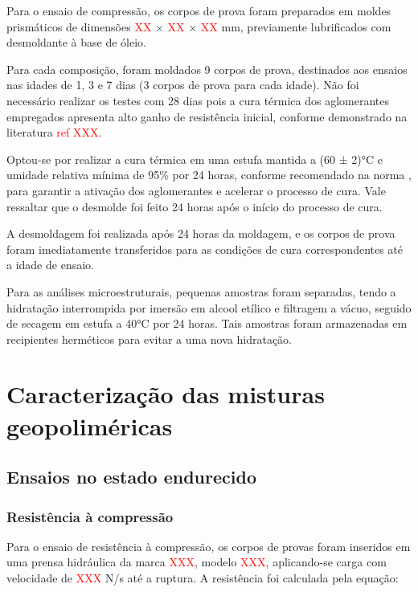 Para o ensaio de compressão, os corpos de prova foram preparados em moldes prismáticos de dimensões \textcolor{red}{XX} × \textcolor{red}{XX} × \textcolor{red}{XX} mm, previamente lubrificados com desmoldante à base de óleio.


Para cada composição, foram moldados 9 corpos de prova, destinados aos ensaios nas idades de 1, 3 e 7 dias (3 corpos de prova para cada idade). Não foi necessário realizar os testes com 28 dias pois a cura térmica dos aglomerantes empregados apresenta alto ganho de resistência inicial, conforme demonstrado na literatura \textcolor{red}{ref XXX}.

Optou-se por realizar a cura térmica em uma estufa mantida a (60 ± 2)°C e umidade relativa mínima de 95\% por 24 horas, conforme recomendado na norma \cite{ABNT9479ABNT_NBR_9479_2006}, para garantir a ativação dos aglomerantes e acelerar o processo de cura.
Vale ressaltar que o desmolde foi feito 24 horas após o início do processo de cura.

A desmoldagem foi realizada após 24 horas da moldagem, e os corpos de prova foram imediatamente transferidos para as condições de cura correspondentes até a idade de ensaio.

Para as análises microestruturais, pequenas amostras foram separadas, tendo a hidratação interrompida por imersão em alcool etílico e filtragem a vácuo, seguido de secagem em estufa a 40°C por 24 horas. Tais amostras foram armazenadas em recipientes herméticos para evitar a uma nova hidratação.

\section{Caracterização das misturas geopoliméricas}
\label{sec:caracterizacao_das_misturas_geopolimericas}

\subsection{Ensaios no estado endurecido}
\label{subsec:ensaios_no_estado_endurecido}

\subsubsection{Resistência à compressão}
\label{subsubsec:resistencia_a_compressao}

Para o ensaio de resistência à compressão, os corpos de provas foram inseridos em uma prensa hidráulica da marca \textcolor{red}{XXX}, modelo \textcolor{red}{XXX}, aplicando-se carga com velocidade de \textcolor{red}{XXX} N/s até a ruptura. A resistência foi calculada pela equação:

